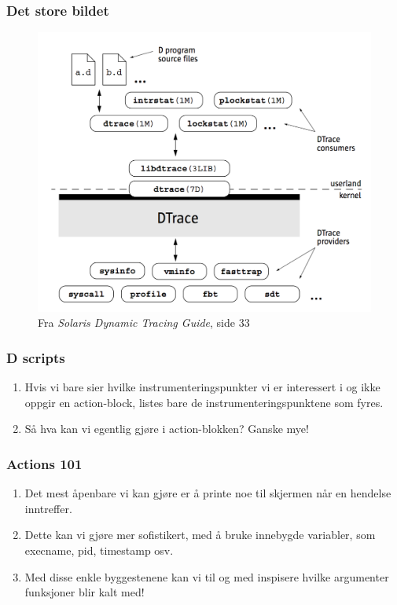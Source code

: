 \documentclass{beamer}
\begin{document}
 \begin{frame}
     \frametitle{Det store bildet}
\begin{figure}
\includegraphics[scale=0.40]{architecture.png}
\caption{Fra \emph{Solaris Dynamic Tracing Guide}, side 33}
\end{figure}
 \end{frame}

 \begin{frame}
     \frametitle{D scripts}
\begin{enumerate}

    \item Hvis vi bare sier hvilke instrumenteringspunkter vi er interessert i
      og ikke oppgir en action-block, listes bare de instrumenteringspunktene
      som fyres.

  \item Så hva kan vi egentlig gjøre i action-blokken? Ganske mye!

\end{enumerate}
 \end{frame}

 \begin{frame}
     \frametitle{Actions 101}
\begin{enumerate}

\item Det mest åpenbare vi kan gjøre er å printe noe til skjermen
    når en hendelse inntreffer.

\item Dette kan vi gjøre mer sofistikert, med å bruke innebygde
    variabler, som execname, pid, timestamp osv.

\item Med disse enkle byggestenene kan vi til og med inspisere hvilke
    argumenter funksjoner blir kalt med!

\end{enumerate}
 \end{frame}
\end{document}
